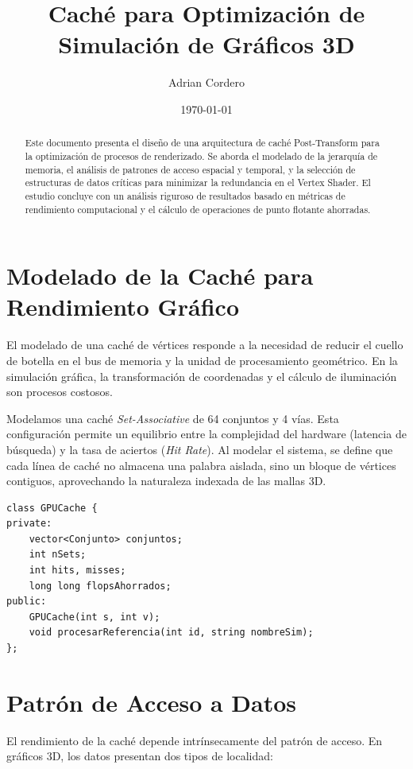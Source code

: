 \documentclass[12pt,a4paper]{article}
\title{\textbf{Caché para Optimización de Simulación de Gráficos 3D}}
\author{Adrian Cordero}
\date{\today}
\begin{document}
\maketitle
\newpage

\begin{abstract}
Este documento presenta el diseño de una arquitectura de caché Post-Transform para la optimización de procesos de renderizado. Se aborda el modelado de la jerarquía de memoria, el análisis de patrones de acceso espacial y temporal, y la selección de estructuras de datos críticas para minimizar la redundancia en el Vertex Shader. El estudio concluye con un análisis riguroso de resultados basado en métricas de rendimiento computacional y el cálculo de operaciones de punto flotante ahorradas.
\end{abstract}

\newpage

\section{Modelado de la Caché para Rendimiento Gráfico}
El modelado de una caché de vértices responde a la necesidad de reducir el cuello de botella en el bus de memoria y la unidad de procesamiento geométrico. En la simulación gráfica, la transformación de coordenadas y el cálculo de iluminación son procesos costosos. 

Modelamos una caché \textit{Set-Associative} de 64 conjuntos y 4 vías. Esta configuración permite un equilibrio entre la complejidad del hardware (latencia de búsqueda) y la tasa de aciertos (\textit{Hit Rate}). Al modelar el sistema, se define que cada línea de caché no almacena una palabra aislada, sino un bloque de vértices contiguos, aprovechando la naturaleza indexada de las mallas 3D.

\begin{lstlisting}
class GPUCache {
private:
    vector<Conjunto> conjuntos;
    int nSets;
    int hits, misses;
    long long flopsAhorrados;
public:
    GPUCache(int s, int v);
    void procesarReferencia(int id, string nombreSim);
};
\end{lstlisting}

\section{Patrón de Acceso a Datos}
El rendimiento de la caché depende intrínsecamente del patrón de acceso. En gráficos 3D, los datos presentan dos tipos de localidad:
\end{document}
